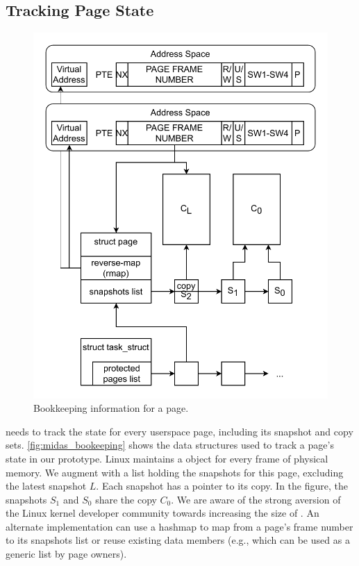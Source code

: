 \documentclass[letterpaper,twocolumn,10pt]{article}
\begin{document}
\subsection{Tracking Page State}

\begin{figure}[]
  \centering
  \includegraphics[width=\linewidth]{img/book-keeping.pdf}
  \caption{Bookkeeping information for a page.}
  \label{fig:midas_bookeeping}
\end{figure}

\midas needs to track the state for every userspace page, including
its snapshot and copy sets.
\autoref{fig:midas_bookeeping} shows the data structures used to
track a page's state in our prototype.
Linux maintains a  object for every frame of
physical memory.
We augment   with a list holding the snapshots
for this page, excluding the latest snapshot $L$.
Each snapshot has a pointer to its copy.
In the figure, the snapshots $S_1$ and $S_0$ share the copy $C_0$.
We are aware of the strong aversion of the
Linux kernel developer community towards increasing the size of
.
An alternate implementation can use a hashmap to
map from a page's frame number to its snapshots list or
reuse existing data members (e.g.,  which
can be used as a generic list by page owners).
\end{document}
